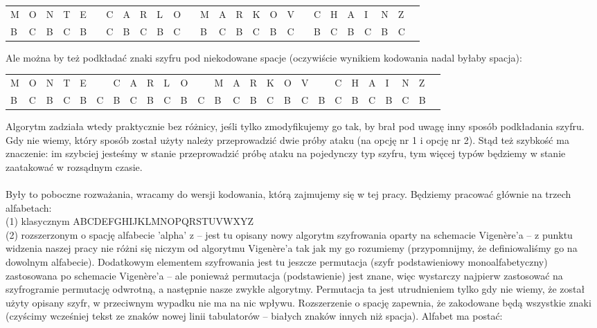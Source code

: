 \documentclass[a4paper]{article}
\theoremstyle{defn}
\theoremstyle{theorem}
\theoremstyle{lemma}
\theoremstyle{cor}
\theoremstyle{fact}
\begin{document}
\begin{center}\begin{tabular}{|p{1.5mm}|p{1.5mm}|p{1.5mm}|p{1.5mm}|p{1.5mm}|p{1.5mm}|p{1.5mm}|p{1.5mm}|p{1.5mm}|p{1.5mm}|p{1.5mm}|p{1.5mm}|p{1.5mm}|p{1.5mm}|p{1.5mm}|p{1.5mm}|p{1.5mm}|p{1.5mm}|p{1.5mm}|p{1.5mm}|p{1.5mm}|p{1.5mm}|p{1.5mm}|p{1.5mm}|p{1.5mm}|p{1.5mm}|}
    M & O & N & T & E & & C & A & R & L & O & & M & A & R & K & O & V & & C & H & A & I & N & Z \\
    B & C & B & C & B & & C & B & C & B & C & & B & C & B & C & B & C & & B & C & B & C & B & C
\end{tabular}
\end{center}
Ale można by też podkładać znaki szyfru pod niekodowane spacje (oczywiście wynikiem kodowania nadal byłaby spacja):\\
\begin{center}\begin{tabular}{|p{1.5mm}|p{1.5mm}|p{1.5mm}|p{1.5mm}|p{1.5mm}|p{1.5mm}|p{1.5mm}|p{1.5mm}|p{1.5mm}|p{1.5mm}|p{1.5mm}|p{1.5mm}|p{1.5mm}|p{1.5mm}|p{1.5mm}|p{1.5mm}|p{1.5mm}|p{1.5mm}|p{1.5mm}|p{1.5mm}|p{1.5mm}|p{1.5mm}|p{1.5mm}|p{1.5mm}|p{1.5mm}|p{1.5mm}|}
    M & O & N & T & E & & C & A & R & L & O & & M & A & R & K & O & V & & C & H & A & I & N & Z \\
    B & C & B & C & B & C & B & C & B & C & B & C & B & C & B & C & B & C & B & C & B & C & B & C & B
\end{tabular}
\end{center}
Algorytm zadziała wtedy praktycznie bez różnicy, jeśli tylko zmodyfikujemy go tak, by brał pod uwagę inny sposób podkładania szyfru. Gdy nie wiemy, który sposób został użyty należy przeprowadzić dwie próby ataku (na opcję nr 1 i opcję nr 2). Stąd też szybkość ma znaczenie: im szybciej jesteśmy w stanie przeprowadzić próbę ataku na pojedynczy typ szyfru, tym więcej typów będziemy w stanie zaatakować w rozsądnym czasie.\\\\
Były to poboczne rozważania, wracamy do wersji kodowania, którą zajmujemy się w tej pracy.
Będziemy pracować głównie na trzech alfabetach:\\
(1) klasycznym ABCDEFGHIJKLMNOPQRSTUVWXYZ\\
(2) rozszerzonym o spację alfabecie 'alpha' z \cite{alphaqwerty} – jest tu opisany nowy algorytm szyfrowania oparty na schemacie Vigenère'a – z punktu widzenia naszej pracy nie różni się niczym od algorytmu Vigenère'a tak jak my go rozumiemy (przypomnijmy, że definiowaliśmy go na dowolnym alfabecie). Dodatkowym elementem szyfrowania jest tu jeszcze permutacja (szyfr podstawieniowy monoalfabetyczny) zastosowana po schemacie Vigenère'a – ale ponieważ permutacja (podstawienie) jest znane, więc wystarczy najpierw zastosować na szyfrogramie permutację odwrotną, a następnie nasze zwykłe algorytmy. Permutacja ta jest utrudnieniem tylko gdy nie wiemy, że został użyty opisany szyfr, w przeciwnym wypadku nie ma na nic wpływu. Rozszerzenie o spację zapewnia, że zakodowane będą wszystkie znaki (czyścimy wcześniej tekst ze znaków nowej linii tabulatorów – białych znaków innych niż spacja). Alfabet ma postać:\\
\end{document}
